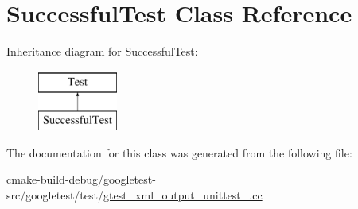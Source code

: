 \hypertarget{classSuccessfulTest}{}\section{Successful\+Test Class Reference}
\label{classSuccessfulTest}
Inheritance diagram for Successful\+Test\+:\begin{figure}[H]
\begin{center}
\leavevmode
\includegraphics[height=2.000000cm]{classSuccessfulTest}
\end{center}
\end{figure}


The documentation for this class was generated from the following file\+:\begin{DoxyCompactItemize}
\item 
cmake-\/build-\/debug/googletest-\/src/googletest/test/\mbox{\hyperlink{gtest__xml__output__unittest___8cc}{gtest\+\_\+xml\+\_\+output\+\_\+unittest\+\_\+.\+cc}}\end{DoxyCompactItemize}
